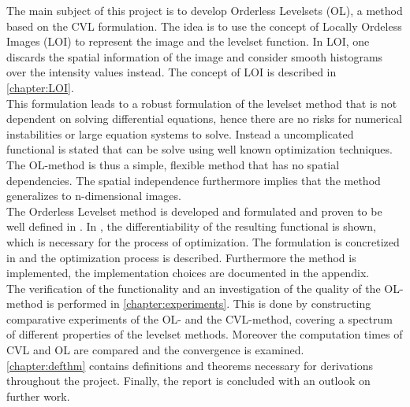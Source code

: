 The main subject of this project is to develop Orderless Levelsets (OL), a method based on the CVL formulation. The idea is to use the concept of Locally Ordeless Images (LOI) to represent the image and the levelset function. In LOI, one discards the spatial information of the image and consider smooth histograms over the intensity values instead. The concept of LOI is described in \cref{chapter:LOI}.\\
This formulation leads to a robust formulation of the levelset method that is not dependent on solving differential equations, hence there are no risks for numerical instabilities or large equation systems to solve. Instead a uncomplicated functional is stated that can be solve using well known optimization techniques. The OL-method is thus a simple, flexible method that has no spatial dependencies. The spatial independence furthermore implies that the method generalizes to n-dimensional images.\\
The Orderless Levelset method is developed and formulated and proven to be well defined in . In , the differentiability of the resulting functional is shown, which is necessary for the process of optimization. The formulation is concretized in  and the optimization process is described. Furthermore the method is implemented, the implementation choices are documented in the appendix.\\

The verification of the functionality and an investigation of the quality of the OL-method is performed in \cref{chapter:experiments}. This is done by constructing comparative experiments of the OL- and the CVL-method, covering a spectrum of different properties of the levelset methods. Moreover the computation times of CVL and OL are compared and the convergence is examined.\\
\cref{chapter:defthm} contains definitions and theorems necessary for derivations throughout the project. Finally, the report is concluded with an outlook on further work.
